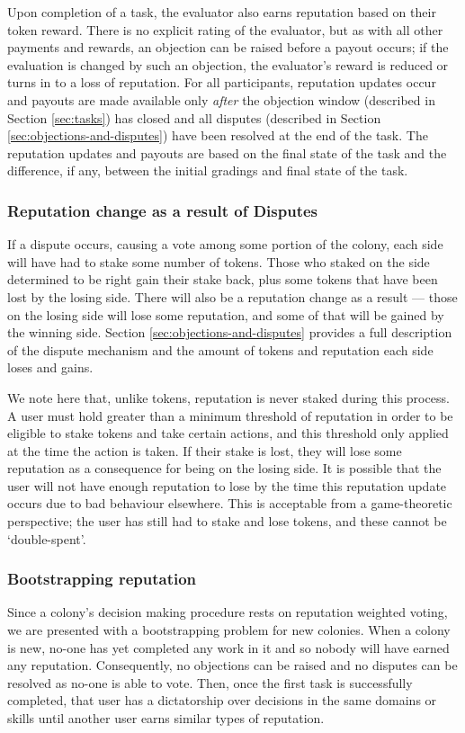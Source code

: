 Upon completion of a task, the evaluator also earns reputation based on their token reward. There is no explicit rating of the evaluator, but as with all other payments and rewards, an objection can be raised before a payout occurs; if the evaluation is changed by such an objection, the evaluator's reward is reduced or turns in to a loss of reputation. For all participants, reputation updates occur and payouts are made available only \emph{after} the objection window (described in Section \ref{sec:tasks}) has closed and all disputes  (described in Section \ref{sec:objections-and-disputes}) have been resolved at the end of the task. The reputation updates and payouts are based on the final state of the task and the difference, if any, between the initial gradings and final state of the task.

\subsubsection{Reputation change as a result of Disputes}\label{sec:earning-rep-in-disputes}
If a dispute occurs, causing a vote among some portion of the colony, each side will have had to stake some number of tokens. Those who staked on the side determined to be right gain their stake back, plus some tokens that have been lost by the losing side. There will also be a reputation change as a result --- those on the losing side will lose some reputation, and some of that will be gained by the winning side. Section \ref{sec:objections-and-disputes} provides a full description of the dispute mechanism and the amount of tokens and reputation each side loses and gains.

We note here that, unlike tokens, reputation is never staked during this process. A user must hold greater than a minimum threshold of reputation in order to be eligible to stake tokens and take certain actions, and this threshold only applied at the time the action is taken. If their stake is lost, they will lose some reputation as a consequence for being on the losing side. It is possible that the user will not have enough reputation to lose by the time this reputation update occurs due to bad behaviour elsewhere. This is acceptable from a game-theoretic perspective; the user has still had to stake and lose tokens, and these cannot be `double-spent'.

\subsubsection{Bootstrapping reputation}\label{sec:bootstrapping-rep}
Since a colony's decision making procedure rests on reputation weighted voting, we are presented with a bootstrapping problem for new colonies. When a colony is new, no-one has yet completed any work in it and so nobody will have earned any reputation. Consequently, no objections can be raised and no disputes can be resolved as no-one is able to vote. Then, once the first task is successfully completed, that user has a dictatorship over decisions in the same domains or skills until another user earns similar types of reputation.

